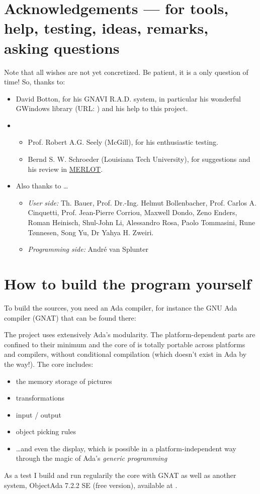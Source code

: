 \documentclass[11pt,a4paper]{article}
\begin{document}
\section{Acknowledgements --- for tools, help, testing, ideas,
remarks, asking questions}
%
Note that all wishes are not yet concretized. Be patient, it is a
only question of time! So, thanks to:
%
\begin{itemize}
  \item David Botton, for his GNAVI R.A.D. system, in
        particular his wonderful GWindows library (URL:
        )
        and his help to this project.
  \item
  \begin{itemize}
    \item
        Prof. Robert A.G. Seely (McGill), for his enthusiastic testing.
    \item
        Bernd S. W. Schroeder (Louisiana Tech University), for suggestions
        and his review in \href{http://www.merlot.org/}{MERLOT}.
  \end{itemize}
  \item Also thanks to \ldots
    \begin{itemize}
    \item {\em User side:}
        Th. Bauer,
        Prof. Dr.-Ing. Helmut Bollenbacher,
        Prof. Carlos A. Cinquetti,
        Prof. Jean-Pierre Corriou,
        Maxwell Dondo,
        Zeno Enders,
        Roman Heinisch,
        Shul-John Li,
        Alessandro Rosa,
        Paolo Tommasini,
        Rune T\o nnesen,
        Song Yu,
        Dr Yahya H. Zweiri.
    \item {\em Programming side:}
        Andr\'e van Splunter
  \end{itemize}
\end{itemize}
%
\section{How to build the program yourself}
%

To build the sources, you need an Ada compiler, for instance the
GNU Ada compiler (GNAT) that can be found there:

The project uses extensively Ada's modularity.
The platform-dependent parts are confined to their minimum and
the core of {\TC} is totally portable across platforms and
compilers, without conditional compilation (which doesn't exist in Ada
by the way!). The core includes:
%
\begin{itemize}
  \item the memory storage of pictures
  \item transformations
  \item input / output
  \item object picking rules
  \item \ldots and even the display, which is possible in a platform-independent
        way through the magic of Ada's {\em generic programming}
\end{itemize}
%
As a test I build and run regularily the core with GNAT as well as another system,
ObjectAda 7.2.2 SE (free version), available at .
\end{document}
